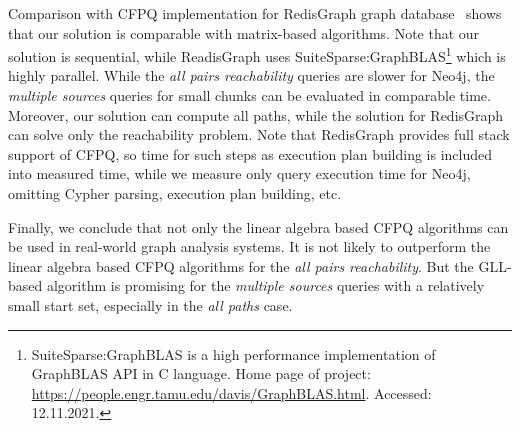 Comparison with CFPQ implementation for RedisGraph graph database~\cite{DBLP:conf/edbt/TerekhovPAZG21} shows that our solution is comparable with matrix-based algorithms. Note that our solution is sequential, while ReadisGraph uses SuiteSparse:GraphBLAS\footnote{SuiteSparse:GraphBLAS is a high performance implementation of GraphBLAS API in C language. Home page of project: \url{https://people.engr.tamu.edu/davis/GraphBLAS.html}. Accessed: 12.11.2021.} which is highly parallel. While the \textit{all pairs reachability} queries are slower for Neo4j, the \textit{multiple sources} queries for small chunks can be evaluated in comparable time. Moreover, our solution can compute all paths, while the solution for RedisGraph can solve only the reachability problem. Note that RedisGraph provides full stack support of CFPQ, so time for such steps as execution plan building is included into measured time, while we measure only query execution time  for Neo4j, omitting Cypher parsing, execution plan building, etc. 

Finally, we conclude that not only the linear algebra based CFPQ algorithms can be used in real-world graph analysis systems. It is not likely to outperform the linear algebra based CFPQ algorithms for the \textit{all pairs reachability}. But the GLL-based algorithm is promising for the \textit{multiple sources} queries with a relatively small start set, especially in the \textit{all paths} case. 